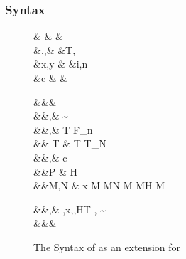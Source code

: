 \documentclass[screen,nonacm]{acmart}
\begin{document}
\subsubsection{Syntax}\label{sec:sfp-syntax}
\begin{figure}[ht]
 \centering
 \begin{syntax}
  & &  & \\
  &\TyVar,\beta,\Co &\qquad{} &T, \\
  &x,y &\qquad{} &i,n \in {} \\
  &c & &
 \end{syntax}
 \begin{syntax}
  &&\square & \\
  &&\kappa,\eta \bnfeq& \STAR \bnfor
                                  \kappa \to \kappa \bnfor \sigma\sim\tau \bnfor \shl{\chi} \bnfor {}\\
  &&\tau,\sigma \bnfeq& \TyVar \bnfor T
                                  \bnfor \tau \to \tau \bnfor
                                  \tau\App\tau \bnfor \Forall {\TyVar\co\kappa} \tau  \bnfor F_n
                                  \bnfor \shl{\Forall \chi \tau} \bnfor \shl{\tau\App\kappa} \bnfor {}\\
  && T \bnfeq& T \bnfor T_N\\
  &&\nu,\Co \bnfeq& c \bnfor {}\tau \bnfor \Sym\Co \bnfor \trans\nu\Co %
 \bnfor \Forall {\TyVar\co\kappa} \Co \bnfor \Co\At\tau %
 \bnfor \nu\App\Co \bnfor \Left \Co \bnfor \Right \Co  %
 \bnfor \shl{\Forall \chi \Co} \bnfor \shl{\Co\App\chi} %
 \bnfor \shl{\Co\At\chi}\\
  &&P \bnfeq& H \App\shl{\many\chi}\App\many{\TyVar\co\kappa} \\
  &&M,N \bnfeq& x \bnfor {} M \bnfor M\App N \bnfor \TLam{\tau\co\kappa} M \bnfor M\App \tau \bnfor H \bnfor \Case M  \bnfor \Cast \Tm \Co %
 \bnfor \shl{\TLam \chi \Tm} \bnfor \shl{\Tm\App\kappa} \\

 \end{syntax}
 \begin{syntax}
  &&\TEnv,\Delta \bnfeq& \empt \bnfor \TEnv,x\co\tau \bnfor \TEnv,\TyVar\co\kappa \bnfor \TEnv,H\co T \bnfor \TEnv, \Co \co \tau\sim\sigma\\
  &&\Subst \bnfeq& \empt \bnfor \Set{\many{\TyVar \mapsto \tau}}
 \end{syntax}
 \caption{The Syntax of \SFP as an extension for \SFC}
 \label{fig:sfp-syntax}
\end{figure}
\end{document}
